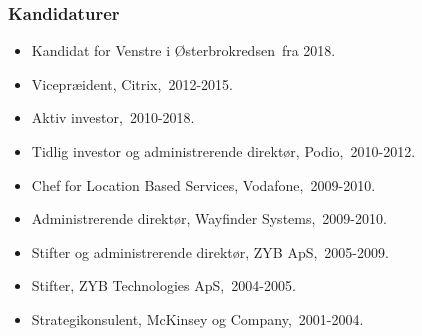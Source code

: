 \documentclass[11pt, a4paper]{awesome-cv}
\begin{document}
\begin{cvletter}
\subsubsection*{Kandidaturer}
\begin{itemize}
\item Kandidat for Venstre i Østerbrokredsen fra 2018.
\end{itemize}
\begin{itemize}
\item Vicepræident, Citrix, 2012-2015.
\item Aktiv investor, 2010-2018.
\item Tidlig investor og administrerende direktør, Podio, 2010-2012.
\item Chef for Location Based Services, Vodafone, 2009-2010.
\item Administrerende direktør, Wayfinder Systems, 2009-2010.
\item Stifter og administrerende direktør, ZYB ApS, 2005-2009.
\item Stifter, ZYB Technologies ApS, 2004-2005.
\item Strategikonsulent, McKinsey og Company, 2001-2004.
\end{itemize}
\end{cvletter}
\end{document}
